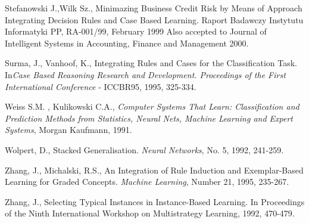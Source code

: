 \documentclass{article}
\begin{document}
\begin{thebibliography}{99}
  Stefanowski J.,Wilk Sz., Minimazing Business Credit Risk by
Means of Approach Integrating Decision Rules and Case Based
Learning. Raport Badawczy Instytutu Informatyki PP, RA-001/99,
February 1999 Also accepted to Journal of Intelligent Systems in
Accounting, Finance and Management 2000.

  Surma, J., Vanhoof, K., Integrating Rules and Cases for the
Classification Task. In{\em Case Based Reasoning Research and Development.
Proceedings of the First International Conference} -  ICCBR95, 1995,
325-334.

  Weiss S.M. , Kulikowski C.A., {\it Computer Systems That
Learn: Classification and Prediction Methods from Statistics, Neural Nets,
Machine Learning and Expert Systems}, Morgan Kaufmann, 1991.

  Wolpert, D., Stacked Generalisation. {\em Neural Networks},
 No. 5,  1992, 241-259.

  Zhang, J., Michalski, R.S., An Integration of Rule
Induction and Exemplar-Based Learning for Graded Concepts. {\em
Machine Learning}, Number 21, 1995, 235-267.

  Zhang, J., Selecting Typical Instances in Instance-Based
Learning. In Proceedings of the Ninth International Workshop on
Multistrategy Learning, 1992, 470-479.
\end{thebibliography}
\end{document}
